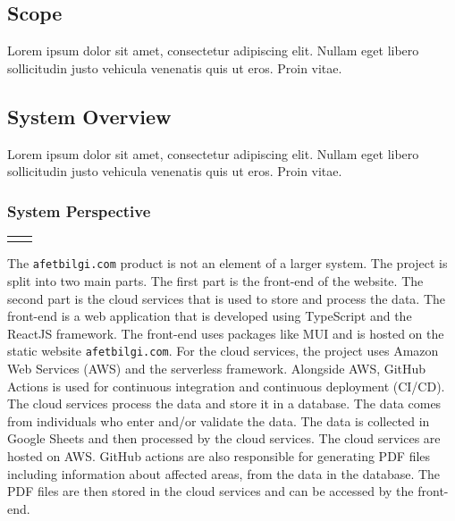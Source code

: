 \documentclass[a4paper]{article}
\begin{document}
            \subsection{Scope}

            Lorem ipsum dolor sit amet, consectetur adipiscing elit. Nullam eget libero sollicitudin justo vehicula venenatis quis ut eros. Proin vitae.

            \subsection{System Overview}

            Lorem ipsum dolor sit amet, consectetur adipiscing elit. Nullam eget libero sollicitudin justo vehicula venenatis quis ut eros. Proin vitae.

                \subsubsection{System Perspective}

                \begin{center}
                    \par
                    \begin{tabular}{cc}
                        \fbox{}
                    \end{tabular}
                    \par
                \end{center}

                The \verb*|afetbilgi.com| product is not an element of a larger system. The project is split into two main parts.
                The first part is the front-end of the website. The second part is the cloud services that is used to store and
                process the data. The front-end is a web application that is developed using TypeScript and the ReactJS framework.
                The front-end uses packages like MUI and is hosted on the static website \verb*|afetbilgi.com|. 
                For the cloud services, the project uses Amazon Web Services (AWS) and the serverless framework. Alongside AWS,
                GitHub Actions is used for continuous integration and continuous deployment (CI/CD). The cloud services process 
                the data and store it in a database. The data comes from individuals who enter and/or validate the data. The data
                is collected in Google Sheets and then processed by the cloud services. The cloud services are hosted on AWS.
                GitHub actions are also responsible for generating PDF files including information about affected areas, from the
                data in the database. The PDF files are then stored in the cloud services and can be accessed by the front-end.
\end{document}
